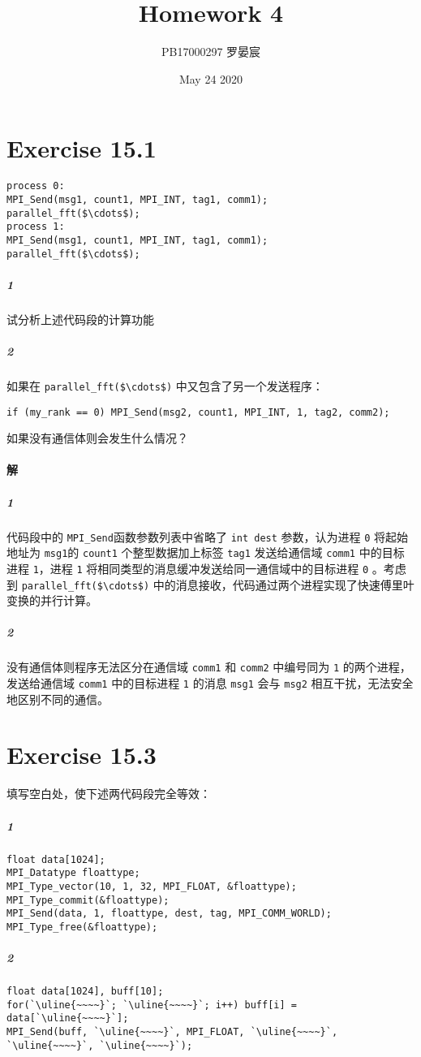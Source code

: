 \documentclass{article}
\title{Homework 4}
\author{PB17000297 罗晏宸}
\date{May 24 2020}
\begin{document}
\maketitle

\section{Exercise 15.1}
\begin{lstlisting}[xleftmargin = .1\textwidth, xrightmargin = .1\textwidth]
process 0:
MPI_Send(msg1, count1, MPI_INT, tag1, comm1);
parallel_fft($\cdots$);
process 1:
MPI_Send(msg1, count1, MPI_INT, tag1, comm1);
parallel_fft($\cdots$);
\end{lstlisting}
\subparagraph{\textcircled{1}} 试分析上述代码段的计算功能
\subparagraph{\textcircled{2}} 如果在 \lstinline{parallel_fft($\cdots$)} 中又包含了另一个发送程序：
\begin{lstlisting}[xleftmargin = .1\textwidth, xrightmargin = .1\textwidth]
    if (my_rank == 0) MPI_Send(msg2, count1, MPI_INT, 1, tag2, comm2);
\end{lstlisting}

如果没有通信体则会发生什么情况？

\paragraph{解}
\subparagraph{\textcircled{1}}
代码段中的 \lstinline{MPI_Send}函数参数列表中省略了 \lstinline{int dest} 参数，认为进程 \lstinline{0} 将起始地址为 \lstinline{msg1}的 \lstinline{count1} 个整型数据加上标签 \lstinline{tag1} 发送给通信域 \lstinline{comm1} 中的目标进程 \lstinline{1}，进程 \lstinline{1} 将相同类型的消息缓冲发送给同一通信域中的目标进程 \lstinline{0} 。考虑到 \lstinline{parallel_fft($\cdots$)} 中的消息接收，代码通过两个进程实现了快速傅里叶变换的并行计算。

\subparagraph{\textcircled{2}}
没有通信体则程序无法区分在通信域 \lstinline{comm1} 和 \lstinline{comm2} 中编号同为 \lstinline{1} 的两个进程，发送给通信域 \lstinline{comm1} 中的目标进程 \lstinline{1} 的消息 \lstinline{msg1} 会与 \lstinline{msg2} 相互干扰，无法安全地区别不同的通信。
\section{Exercise 15.3}
填写空白处，使下述两代码段完全等效：
\subparagraph{\textcircled{1}}
\begin{lstlisting}[xleftmargin = .1\textwidth, xrightmargin = .1\textwidth, ]
float data[1024];
MPI_Datatype floattype;
MPI_Type_vector(10, 1, 32, MPI_FLOAT, &floattype);
MPI_Type_commit(&floattype);
MPI_Send(data, 1, floattype, dest, tag, MPI_COMM_WORLD);
MPI_Type_free(&floattype);
\end{lstlisting}
\subparagraph{\textcircled{2}}
\begin{lstlisting}[xleftmargin = .1\textwidth, xrightmargin = .1\textwidth]
float data[1024], buff[10];
for(`\uline{~~~~}`; `\uline{~~~~}`; i++) buff[i] = data[`\uline{~~~~}`];
MPI_Send(buff, `\uline{~~~~}`, MPI_FLOAT, `\uline{~~~~}`, `\uline{~~~~}`, `\uline{~~~~}`);
\end{lstlisting}
\end{document}
